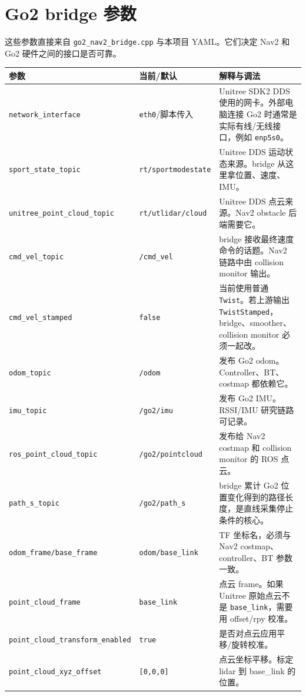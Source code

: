 \documentclass[UTF8,11pt,a4paper,openany]{ctexrep}
\newcommand{\code}[1]{\nolinkurl{#1}}
\newcommand{\topic}[1]{\nolinkurl{#1}}
\newcommand{\param}[1]{\nolinkurl{#1}}
\newcommand{\file}[1]{\nolinkurl{#1}}
\begin{document}
\section{Go2 bridge 参数}

这些参数直接来自 \file{go2_nav2_bridge.cpp} 与本项目 YAML。它们决定 Nav2 和 Go2 硬件之间的接口是否可靠。

\begin{footnotesize}
\begin{longtable}{L{0.36\textwidth}L{0.18\textwidth}L{0.36\textwidth}}
\toprule
参数 & 当前/默认 & 解释与调法 \\
\midrule
\param{network_interface} & \code{eth0}/脚本传入 & Unitree SDK2 DDS 使用的网卡。外部电脑连接 Go2 时通常是实际有线/无线接口，例如 \code{enp5s0}。 \\
\param{sport_state_topic} & \code{rt/sportmodestate} & Unitree DDS 运动状态来源。bridge 从这里拿位置、速度、IMU。 \\
\param{unitree_point_cloud_topic} & \code{rt/utlidar/cloud} & Unitree DDS 点云来源。Nav2 obstacle 后端需要它。 \\
\param{cmd_vel_topic} & \topic{/cmd_vel} & bridge 接收最终速度命令的话题。Nav2 链路中由 collision monitor 输出。 \\
\param{cmd_vel_stamped} & \code{false} & 当前使用普通 \code{Twist}。若上游输出 \code{TwistStamped}，bridge、smoother、collision monitor 必须一起改。 \\
\param{odom_topic} & \topic{/odom} & 发布 Go2 odom。Controller、BT、costmap 都依赖它。 \\
\param{imu_topic} & \topic{/go2/imu} & 发布 Go2 IMU。RSSI/IMU 研究链路可记录。 \\
\param{ros_point_cloud_topic} & \topic{/go2/pointcloud} & 发布给 Nav2 costmap 和 collision monitor 的 ROS 点云。 \\
\param{path_s_topic} & \topic{/go2/path_s} & bridge 累计 Go2 位置变化得到的路径长度，是直线采集停止条件的核心。 \\
\param{odom_frame/base_frame} & \code{odom/base_link} & TF 坐标名，必须与 Nav2 costmap、controller、BT 参数一致。 \\
\param{point_cloud_frame} & \code{base_link} & 点云 frame。如果 Unitree 原始点云不是 \code{base_link}，需要用 offset/rpy 校准。 \\
\param{point_cloud_transform_enabled} & \code{true} & 是否对点云应用平移/旋转校准。 \\
\param{point_cloud_xyz_offset} & \code{[0,0,0]} & 点云坐标平移。标定 lidar 到 base\_link 的位置。 \\

\end{longtable}
\end{footnotesize}
\end{document}
